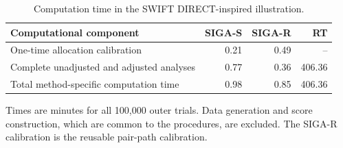 \begin{table}[!htbp]
\centering
\caption{Computation time in the SWIFT DIRECT-inspired illustration.}
\label{tab:swift-direct-siga-timing}
\begin{threeparttable}
\small
\begin{tabular}{lrrr}
\toprule
Computational component & SIGA-S & SIGA-R & RT \\ 
\midrule
One-time allocation calibration & 0.21 & 0.49 & -- \\ 
Complete unadjusted and adjusted analyses & 0.77 & 0.36 & 406.36 \\ 
Total method-specific computation time & 0.98 & 0.85 & 406.36 \\ 
\bottomrule
\end{tabular}
\begin{tablenotes}[flushleft]
\footnotesize
\item Times are minutes for all 100,000 outer trials. Data generation and score construction, which are common to the procedures, are excluded. The SIGA-R calibration is the reusable pair-path calibration.
\end{tablenotes}
\end{threeparttable}
\end{table}

